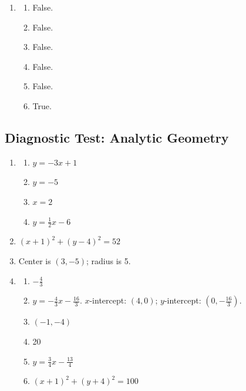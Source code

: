 \documentclass{article}
\begin{document}
\begin{enumerate}
\begin{enumerate}[label=(\alph*)]
          \end{enumerate}
    \item \begin{enumerate}[label=(\alph*)]
              \item False.
              \item False.
              \item False.
              \item False.
              \item False.
              \item True.
          \end{enumerate}
\end{enumerate}

\subsection{Diagnostic Test: Analytic Geometry}
\begin{enumerate}
    \item \begin{enumerate}[label=(\alph*)]
              \item $y=-3x+1$
              \item $y=-5$
              \item $x=2$
              \item $y=\frac{1}{2}x-6$
          \end{enumerate}
    \item $(x+1)^2+(y-4)^2=52$
    \item Center is $(3, -5)$; radius is 5.
    \item \begin{enumerate}[label=(\alph*)]
              \item $-\frac{4}{3}$
              \item $y=-\frac{4}{3}x-\frac{16}{3}$. $x$-intercept: $(4, 0)$; $y$-intercept:
                    $(0, -\frac{16}{3})$.
              \item $(-1, -4)$
              \item 20
              \item $y=\frac{3}{4}x-\frac{13}{4}$
              \item $(x+1)^2+(y+4)^2=100$
          \end{enumerate}
\end{enumerate}
\end{document}
